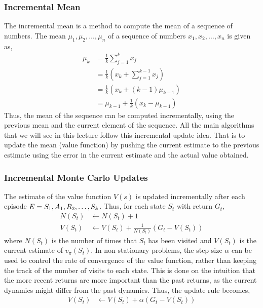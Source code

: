 \subsubsection*{Incremental Mean}
The incremental mean is a method to compute the mean of a sequence of numbers.
The mean \(\mu_1, \mu_2, \dots, \mu_n\) of a sequence of numbers \(x_1, x_2, \dots, x_n\)
is given as,
\[
    \begin{aligned}
        \mu_k &= \frac{1}{k}\sum_{j=1}^{k}x_j \\
        &= \frac{1}{k}(x_k + \sum_{j=1}^{k-1}x_j) \\
        &= \frac{1}{k}(x_k + (k-1)\mu_{k-1}) \\
        &= \mu_{k-1} + \frac{1}{k}(x_k - \mu_{k-1})      
    \end{aligned}
\] 
Thus, the mean of the sequence can be computed incrementally, using the previous
mean and the current element of the sequence. All the main algorithms that we will see in
this lecture follow this incremental update idea. That is to update the mean (value function)
by pushing the current estimate to the previous estimate using the error in the current
estimate and the actual value obtained.

\subsubsection{Incremental Monte Carlo Updates}
The estimate of the value function \(V(s)\) is updated incrementally after each episode
\(E = S_1, A_1, \\R_2, \dots, S_k\). Thus, for each state \(S_t\) with return \(G_t\),
\[
    \begin{aligned}
        N(S_t) &\leftarrow N(S_t) + 1 \\
        V(S_t) &\leftarrow V(S_t) + \frac{1}{N(S_t)}\left( 
            G_t - V(S_t)
         \right) 
    \end{aligned}
\]
where \(N(S_t)\) is the number of times that \(S_t\) has been visited and \(V(S_t)\)
is the current estimate of \(v_{\pi}(S_t)\). In non-stationary problems, the step size
\(\alpha\) can be used to control the rate of convergence of the value function, rather
than keeping the track of the number of visits to each state. This is done on the intuition
that the more recent returns are more important than the past returns, as the current
dynamics might differ from the past dynamics.
Thus, the update rule becomes,
\[
    \begin{aligned}
        V(S_t) &\leftarrow V(S_t) + \alpha\left( 
            G_t - V(S_t)
         \right) 
    \end{aligned}
\]

